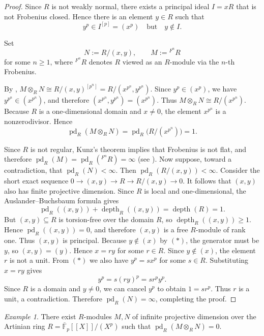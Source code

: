\documentclass[11.05pt,a4paper]{amsart}
\theoremstyle{definition}
\theoremstyle{remark}
\newtheorem{example}[theorem]{Example}
\newcommand{\pd}{\operatorname{pd}}
\newcommand{\depth}{\operatorname{depth}}
\begin{document}
\begin{proof}
	Since $R$ is not weakly normal, there exists a principal ideal $I=xR$ that is not Frobenius closed. Hence there is an element $y\in R$ such that
	\[
	y^p \in I^{[p]}=(x^p) \quad \text{but} \quad y\notin I. \tag{$\ast$}
	\]
	
	Set
	\[
	N:=R/(x,y), \qquad M:={}^{F^n}\!R
	\]
	for some $n\ge 1$, where ${}^{F^n}\!R$ denotes $R$ viewed as an $R$-module via the $n$-th Frobenius.
	
	By \cite[8.2.2(b)]{BH},
	\(
	M\otimes_R N \cong R/(x,y)^{[p^n]} = R/(x^{p^n},y^{p^n}).
	\)
	Since $y^p \in (x^p)$, we have $y^{p^n}\in (x^{p^n})$, and therefore
	\(
	(x^{p^n},y^{p^n})=(x^{p^n}).
	\)
	Thus
	\(
	M\otimes_R N \cong R/(x^{p^n}).
	\)
	Because $R$ is a one-dimensional domain and $x\neq 0$, the element $x^{p^n}$ is a nonzerodivisor. Hence
	\[
	\pd_R(M\otimes_R N)=\pd_R\big(R/(x^{p^n})\big)=1.
	\]
	
	Since $R$ is not regular, Kunz’s theorem implies that Frobenius is not flat, and therefore
	\(
	\pd_R(M)=\pd_R({}^{F^n}\!R)=\infty
	\)
	(see \cite[8.2.8]{BH}).
	Now suppose, toward a contradiction, that $\pd_R(N)<\infty$. Then $\pd_R(R/(x,y))<\infty$. Consider the short exact sequence
	\(
	0 \longrightarrow (x,y) \longrightarrow R \longrightarrow R/(x,y) \longrightarrow 0.
	\)
	It follows that $(x,y)$ also has finite projective dimension. Since $R$ is local and one-dimensional, the Auslander–Buchsbaum formula gives
	\[
	\pd_R((x,y)) + \depth_R((x,y)) = \depth(R)=1.
	\]
	But $(x,y)\subseteq R$ is torsion-free over the domain $R$, so $\depth_R((x,y))\ge 1$. Hence $\pd_R((x,y))=0$, and therefore $(x,y)$ is a free $R$-module of rank one. Thus $(x,y)$ is principal.
	Because $y\notin (x)$ by $(\ast)$, the generator must be $y$, so $(x,y)=(y)$. Hence $x=ry$ for some $r\in R$. Since $y\notin (x)$, the element $r$ is not a unit.
	From $(\ast)$ we also have $y^p = s x^p$ for some $s\in R$. Substituting $x=ry$ gives
	\[
	y^p = s(r y)^p = s r^p y^p.
	\]
	Since $R$ is a domain and $y\neq 0$, we can cancel $y^p$ to obtain
	\(
	1 = s r^p.
	\)
	Thus $r$ is a unit, a contradiction.
	Therefore $\pd_R(N)=\infty$, completing the proof.
\end{proof}

\begin{example}
	There exist $R$-modules $M,N$ of infinite projective dimension over the Artinian ring
	\(
	R=\overline{\mathbb{F}}_p[[X]]/(X^p)
	\)
	such that
	\(
	\pd_R(M\otimes_R N)=0.
	\)
\end{example}
\end{document}
